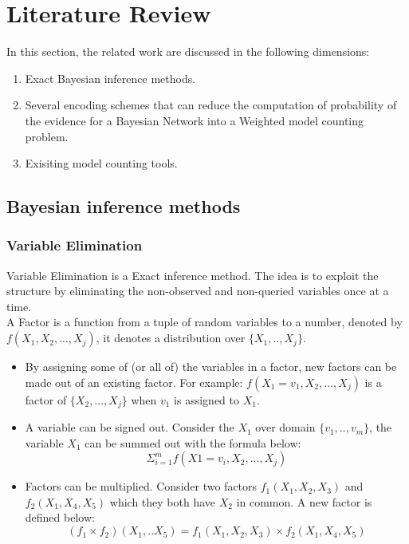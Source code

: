 \newpage
\section{Literature Review}
In this section, the related work are discussed in the following dimensions:
\begin{enumerate}
    \item Exact Bayesian inference methods.
    \item Several encoding schemes that can reduce the computation of probability of the evidence for a Bayesian Network into a Weighted model counting problem. 
    \item Exisiting model counting tools.
\end{enumerate}
    \subsection{Bayesian inference methods}
        \subsubsection{Variable Elimination}
        Variable Elimination is a Exact inference method. The idea is to exploit the structure by eliminating the non-observed and non-queried variables once at a time.\\
        
       \noindent A Factor is a function from a tuple of random variables to a number, denoted by $f(X_{1}, X_{2}, ... , X_{j})$, it denotes a distribution over $\{X_{1}, .., X_{j}\}$. 
        \begin{itemize}
            \item  By assigning some of (or all of) the variables in a factor, new factors can be made out of an existing factor. For example: $f(X_{1} = v_{1}, X_{2}, ..., X_{j})$ is a factor of $\{X_{2}, ... , X_{j}\}$ when $v_{1}$ is assigned to $X_{1}$.
            \item A variable can be signed out. Consider the $X_{1}$ over domain $\{v_{1}, .. ,v_{m}\}$, the variable $X_{1}$ can be summed out with the formula below: $$\Sigma_{i= 1}^{m}f(X1 = v_{i}, X_{2}, ..., X_{j})$$
            \item Factors can be multiplied. Consider two factors $f_{1}(X_{1}, X_{2}, X_{3})$ and $f_{2}(X_{1}, X_{4}, X_{5})$ which they both have $X_{2}$ in common. A new factor is defined below: $$(f_{1} \times f_{2})(X_{1}, .. X_{5}) = f_{1}(X_{1}, X_{2}, X_{3}) \times f_{2}(X_{1}, X_{4}, X_{5}) $$
        \end{itemize}
        
